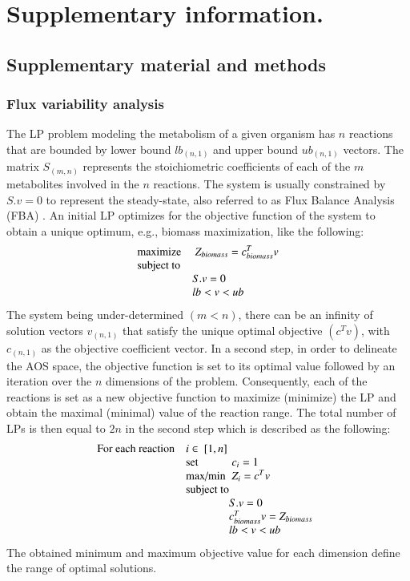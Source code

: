 \documentclass[8pt,a4paper]{book}
\begin{document}
\chapter*{Supplementary information.}

\newpage
\section*{Supplementary material and methods}
\subsection*{Flux variability analysis}
The LP problem modeling the metabolism of a given organism has $n$ reactions that are bounded by lower bound $lb_{(n,1)}$ and upper bound $ub_{(n,1)}$ vectors.  The matrix $S_{(m,n)}$ represents the stoichiometric coefficients of each of the $m$ metabolites involved in the $n$ reactions. The system is usually constrained by $S.v=0$ to represent the steady-state, also referred to as Flux Balance Analysis (FBA) \cite{orth2010flux}. An initial LP optimizes for the objective function of the system to obtain a unique optimum, e.g., biomass maximization, like the following:
\begin{equation} \label{eq:one}
\begin{array}{ll@{}ll}
\text{maximize}  & \displaystyle\ Z_{biomass}=c^{T}_{biomass}v &\\
\text{subject to}\\
& S.v=0 \\
& lb<v<ub
\end{array}
\end{equation}
The system being under-determined $(m<n)$, there can be an infinity of solution vectors $v_{(n,1)}$ that satisfy the unique optimal objective $(c^{T}v)$, with $c_{(n,1)}$ as the objective coefficient vector. In a second step, in order to delineate the AOS space, the objective function is set to its optimal value followed by an iteration over the $n$ dimensions of the problem. Consequently, each of the reactions is set as a new objective function to maximize (minimize) the LP and obtain the maximal (minimal) value of the reaction range. The total number of LPs is then equal to $2n$ in the second step which is described as the following:
\begin{equation} \label{eq:two}
\begin{array}{ll@{}ll@{}ll}
\text{For each reaction} & i \in \displaystyle\ [1,n] &\\
& \text{set} & \displaystyle\ c_{i}=1 &\\
& \text{max/min}  & \displaystyle\ Z_{i}=c^{T}v &\\
& \text{subject to}\\
& & S.v=0 \\
& & c^{T}_{biomass}v=Z_{biomass} \\
& & lb<v<ub
\end{array}
\end{equation}
The obtained minimum and maximum objective value for each dimension define the range of optimal solutions.
\end{document}
